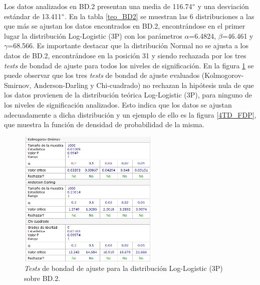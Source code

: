 \documentclass[12pt]{report}
\begin{document}
Los datos analizados en BD.2 presentan una media de 116.74$\degree$ y una desviación estándar de 13.411$\degree$.
En la tabla \ref{teo_BD2}  se muestran las 6 distribuciones a las que más se ajustan los datos encontrados en BD.2, encontrándose en el primer lugar la distribución Log-Logistic (3P) con los parámetros $\alpha$=6.4824, $\beta$=46.461 y $\gamma$=68.566. Es importante destacar que la distribución Normal no se ajusta a los datos de BD.2, encontrándose en la posición 31 y siendo rechazada por los tres \textit{tests} de bondad de ajuste para todos los niveles de significación. En la figura \ref{4TD_BONDAD} se puede observar que los tres \textit{tests} de bondad de ajuste evaluados (Kolmogorov-Smirnov, Anderson-Darling y Chi-cuadrado) no rechazan la hipótesis nula de que los datos provienen de la distribución teórica Log-Logistic (3P), para ninguno de los niveles de significación analizados. Esto indica que los datos se ajustan adecuadamente a dicha distribución y un ejemplo de ello es la figura \ref{4TD_FDP}, que muestra la función de densidad de probabilidad de la misma. 
\begin{figure}[hbpt]
	\centering
	
	\includegraphics[width=0.6\textwidth]{4td_bondad.png}
	\caption{\textit{Tests} de bondad de ajuste para la distribución Log-Logistic (3P) sobre BD.2.}
	\label{4TD_BONDAD}
\end{figure}




\end{document}
